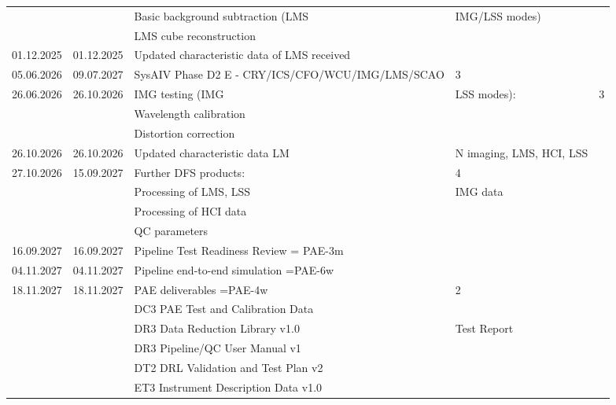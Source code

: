 \begin{table}
\begin{tabularx}{\textwidth}{lllll}
           &               &	Basic background subtraction (LMS & IMG/LSS modes)          &	\\
           &               &    LMS cube reconstruction                                     &	\\
\hline
01.12.2025 &    01.12.2025 & 	Updated characteristic data of LMS received		    &   \\
05.06.2026 & 	09.07.2027 &	SysAIV Phase D2 E - CRY/ICS/CFO/WCU/IMG/LMS/SCAO            &   3 \\
26.06.2026 &	26.10.2026 &	IMG testing (IMG & LSS modes):                              &	3 \\
           &               &    Wavelength calibration        	                            &	\\              
           &               &    Distortion correction                                       &      \\
\hline
26.10.2026 &	26.10.2026 & Updated characteristic data LM & N imaging, LMS, HCI, LSS      & 	\\
\hline
27.10.2026 &	15.09.2027 &	Further DFS products:		                            &	4 \\
           &               &    Processing of LMS, LSS & IMG data                           &	\\
           &               &    Processing of HCI data                                      &	\\
           &               &    QC parameters					            &	\\
\hline
16.09.2027 &	16.09.2027 &	Pipeline Test Readiness Review = PAE-3m			    &	\\
\hline
04.11.2027 &	04.11.2027 &	Pipeline end-to-end simulation  =PAE-6w			    &	\\
\hline
18.11.2027 &	18.11.2027 &	PAE deliverables =PAE-4w                                    &	2 \\
           &               &	DC3 PAE Test and Calibration Data                           &	\\
           &               &	DR3 Data Reduction Library v1.0 & Test Report               &	\\
           &               &	DR3 Pipeline/QC User Manual v1                              &	\\
           &	     	   &    DT2 DRL Validation and Test Plan v2                         &	\\
           &      	   &	ET3 Instrument Description Data v1.0                        &	\\

\end{tabularx}
\end{table}
